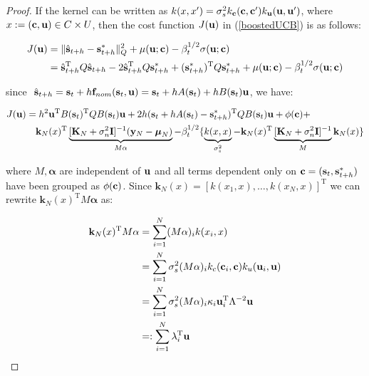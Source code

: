 \begin{proof}
If the kernel can be written as $k(x,x') = \sigma_{s}^{2}k_{\mathbf{c}}(\mathbf{c},\mathbf{c}')k_{\mathbf{u}}(\mathbf{u},\mathbf{u}')$, where $x := (\mathbf{c},\mathbf{u}) \in C \times U$, then the cost function $J(\mathbf{u})$ in (\ref{boostedUCB}) is as follows:

\begin{align*}
J(\mathbf{u}) &= \|\hat{\mathbf{s}}_{t+h} - \mathbf{s}^{*}_{t+h}\|_{Q}^{2} + \mu(\mathbf{u};\mathbf{c}) - \beta_t^{1/2}\sigma(\mathbf{u};\mathbf{c}) \\
&= \hat{\mathbf{s}}_{t+h}^{\mathrm{T}}Q\hat{\mathbf{s}}_{t+h} - 2\hat{\mathbf{s}}_{t+h}^{\mathrm{T}}Q\mathbf{s}^{*}_{t+h} + (\mathbf{s}^{*}_{t+h})^{\mathrm{T}}Q\mathbf{s}^{*}_{t+h} + \mu(\mathbf{u};\mathbf{c}) - \beta_t^{1/2}\sigma(\mathbf{u};\mathbf{c}) 
\end{align*}

since $\ \hat{\mathbf{s}}_{t+h} = \mathbf{s}_{t} + h\mathbf{f}_{nom}(\mathbf{s}_{t}, \mathbf{u}) = \mathbf{s}_{t} + hA(\mathbf{s}_{t}) + hB(\mathbf{s}_{t})\mathbf{u}$, we have:

\begin{align*}
J(\mathbf{u}) &= h^{2}\mathbf{u}^{\mathrm{T}}B(\mathbf{s}_{t})^{\mathrm{T}}QB(\mathbf{s}_{t})\mathbf{u} + 2h(\mathbf{s}_{t} + hA(\mathbf{s}_{t}) - \mathbf{s}^{*}_{t+h})^{\mathrm{T}}QB(\mathbf{s}_{t})\mathbf{u} + \phi(\mathbf{c}) + \\ 
& \quad \mathbf{k}_N(x)^{\mathrm{T}}\underbrace{[\mathbf{K}_N + \sigma_{n}^{2}\mathbf{I}]^{-1}(\mathbf{y}_N - \boldsymbol{\mu}_N)}_{M\mathbf{\alpha}} - \beta_t^{1/2} \lbrace \underbrace{k(x,x)}_{\sigma_{s}^{2}} - \mathbf{k}_N(x)^{\mathrm{T}}\underbrace{[\mathbf{K}_N + \sigma_{n}^{2}\mathbf{I}]^{-1}}_{M} \mathbf{k}_N(x) \rbrace
\end{align*}

where $M, \mathbf{\alpha}$ are independent of $\mathbf{u}$ and all terms dependent only on $\mathbf{c} = (\mathbf{s}_{t}, \mathbf{s}^{*}_{t+h})$ have been grouped as $\phi(\mathbf{c})$. Since $\mathbf{k}_N(x) = [k(x_1,x),\ldots,k(x_N,x)]^\mathrm{T}$ we can rewrite $\mathbf{k}_{N}(x)^{\mathrm{T}}M\mathbf{\alpha}$ as:

\begin{align*}
\mathbf{k}_{N}(x)^{\mathrm{T}}M\mathbf{\alpha} &= \sum_{i=1}^{N} (M\alpha)_{i}k(x_{i},x) \\
&= \sum_{i=1}^{N} \sigma_{s}^{2}(M\alpha)_{i}k_c(\mathbf{c}_{i},\mathbf{c})k_u(\mathbf{u}_{i},\mathbf{u}) \\
&= \sum_{i=1}^{N} \sigma_{s}^{2}(M\alpha)_{i}\kappa_{i}\mathbf{u}_{i}^{\mathrm{T}}\Lambda^{-2}\mathbf{u} \\
&=: \sum_{i=1}^{N} \lambda_{i}^{\mathrm{T}}\mathbf{u}
\end{align*}


\end{proof}
